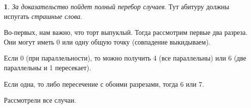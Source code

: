 \documentclass[14pt, a4paper]{extarticle}
\theoremstyle{definition}
\newtheorem{problem}{}
\theoremstyle{definition}
\theoremstyle{remark}
\numberwithin{equation}{section}
\begin{document}
\begin{problem}
    \textit{За доказательство пойдет полный перебор случаев}.
    Тут абитуру должны испугать \textit{страшные слова}.

    Во-первых, нам важно, что торт выпуклый. Тогда рассмотрим первые два разреза.
    Они могут иметь 0 или одну общую точку (совпадение выкидываем).

    Если 0 (при параллельности), то можно получить 4 (все параллельны)
    или 6 (две параллельны и 1 пересекает). 
    
    Если одна, то либо пересечение с обоими разрезами, 
    тогда 6 или 7.

    Рассмотрели все случаи.
\end{problem}
\end{document}
